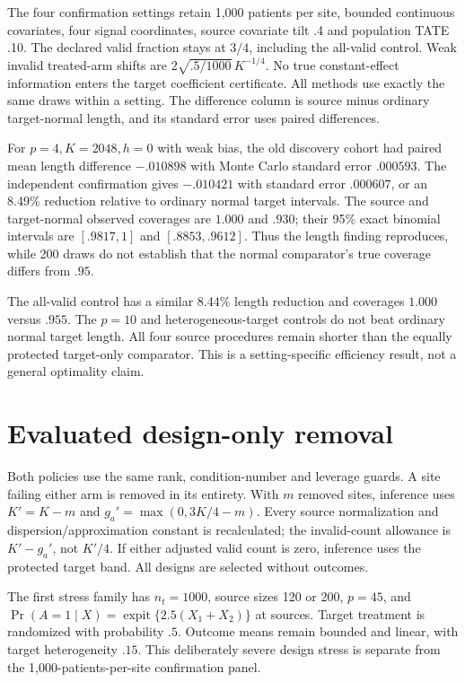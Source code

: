 \documentclass[11pt]{article}
\begin{document}
The four confirmation settings retain 1,000 patients per site, bounded
continuous covariates, four signal coordinates, source covariate tilt .4 and
population TATE .10. The declared valid fraction stays at $3/4$, including
the all-valid control. Weak invalid treated-arm shifts are
$2\sqrt{.5/1000}\,K^{-1/4}$. No true constant-effect information enters the
target coefficient certificate. All methods use exactly the same draws
within a setting. The difference column is source minus ordinary target-normal
length, and its standard error uses paired differences.

\begin{center}\small
\resizebox{\linewidth}{!}{}
\end{center}

For $p=4,K=2048,h=0$ with weak bias, the old discovery cohort had paired mean
length difference $-.010898$ with Monte Carlo standard error $.000593$.
The independent confirmation gives $-.010421$ with standard error $.000607$,
or an 8.49\% reduction relative to ordinary normal target intervals. The
source and target-normal observed coverages are $1.000$ and $.930$; their
95\% exact binomial intervals are $[.9817,1]$ and $[.8853,.9612]$.
Thus the length finding reproduces, while 200 draws do not establish that
the normal comparator's true coverage differs from $.95$.

The all-valid control has a similar 8.44\% length reduction and coverages
$1.000$ versus $.955$. The $p=10$ and heterogeneous-target controls do not
beat ordinary normal target length. All four source procedures remain shorter
than the equally protected target-only comparator. This is a setting-specific
efficiency result, not a general optimality claim.

\section{Evaluated design-only removal}

Both policies use the same rank, condition-number and leverage guards. A site
failing either arm is removed in its entirety. With $m$ removed sites, inference
uses $K'=K-m$ and $g_a'=\max(0,3K/4-m)$. Every source normalization and
dispersion/approximation constant is recalculated; the invalid-count allowance
is $K'-g_a'$, not $K'/4$. If either adjusted valid count is zero, inference
uses the protected target band. All designs are selected without outcomes.

The first stress family has $n_t=1000$, source sizes 120 or 200, $p=45$,
and $\Pr(A=1\mid X)=\operatorname{expit}\{2.5(X_1+X_2)\}$ at sources.
Target treatment is randomized with probability $.5$. Outcome means remain
bounded and linear, with target heterogeneity $.15$. This deliberately severe
design stress is separate from the 1,000-patients-per-site confirmation panel.
\end{document}

